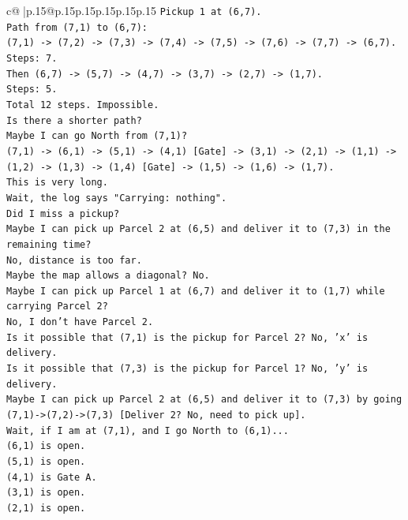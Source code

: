 \documentclass{article}
\begin{document}
{\begin{supertabular}{c@{$\;$}|p{.15\linewidth}@{}p{.15\linewidth}p{.15\linewidth}p{.15\linewidth}p{.15\linewidth}p{.15\linewidth}}
{{{\texttt{Pickup 1 at (6,7).} \\
\texttt{Path from (7,1) to (6,7):} \\
\texttt{(7,1) {-}> (7,2) {-}> (7,3) {-}> (7,4) {-}> (7,5) {-}> (7,6) {-}> (7,7) {-}> (6,7).} \\
\texttt{Steps: 7.} \\
\texttt{Then (6,7) {-}> (5,7) {-}> (4,7) {-}> (3,7) {-}> (2,7) {-}> (1,7).} \\
\texttt{Steps: 5.} \\
\texttt{Total 12 steps. Impossible.} \\
\texttt{Is there a shorter path?} \\
\texttt{Maybe I can go North from (7,1)?} \\
\texttt{(7,1) {-}> (6,1) {-}> (5,1) {-}> (4,1) {[}Gate{]} {-}> (3,1) {-}> (2,1) {-}> (1,1) {-}> (1,2) {-}> (1,3) {-}> (1,4) {[}Gate{]} {-}> (1,5) {-}> (1,6) {-}> (1,7).} \\
\texttt{This is very long.} \\
\texttt{Wait, the log says "Carrying: nothing".} \\
\texttt{Did I miss a pickup?} \\
\texttt{Maybe I can pick up Parcel 2 at (6,5) and deliver it to (7,3) in the remaining time?} \\
\texttt{No, distance is too far.} \\
\texttt{Maybe the map allows a diagonal? No.} \\
\texttt{Maybe I can pick up Parcel 1 at (6,7) and deliver it to (1,7) while carrying Parcel 2?} \\
\texttt{No, I don't have Parcel 2.} \\
\texttt{Is it possible that (7,1) is the pickup for Parcel 2? No, 'x' is delivery.} \\
\texttt{Is it possible that (7,3) is the pickup for Parcel 1? No, 'y' is delivery.} \\
\texttt{Maybe I can pick up Parcel 2 at (6,5) and deliver it to (7,3) by going (7,1){-}>(7,2){-}>(7,3) {[}Deliver 2? No, need to pick up{]}.} \\
\texttt{Wait, if I am at (7,1), and I go North to (6,1)...} \\
\texttt{(6,1) is open.} \\
\texttt{(5,1) is open.} \\
\texttt{(4,1) is Gate A.} \\
\texttt{(3,1) is open.} \\
\texttt{(2,1) is open.} \\
}}}
\end{supertabular}}
\end{document}
